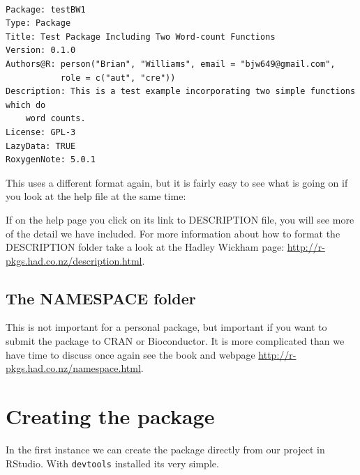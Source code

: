\documentclass[titlepage]{book}\usepackage{knitr}
\begin{document}
\begin{lstlisting}

Package: testBW1
Type: Package
Title: Test Package Including Two Word-count Functions
Version: 0.1.0
Authors@R: person("Brian", "Williams", email = "bjw649@gmail.com",
           role = c("aut", "cre"))
Description: This is a test example incorporating two simple functions which do
    word counts.
License: GPL-3
LazyData: TRUE
RoxygenNote: 5.0.1

\end{lstlisting}

This uses a different format again, but it is fairly easy to see what is going on if you look at the help file at the same time:

\begin{knitrout}
\color{fgcolor}\begin{kframe}
\begin{alltt}
\hlstd{(}\hlstd{=}\hlstd{)}
\end{alltt}
\end{kframe}
\end{knitrout}
If on the help page you click on its link to DESCRIPTION file, you will see more of the detail we have included.  For more information about how to format the DESCRIPTION folder take a look at the Hadley Wickham page: \href{http://r-pkgs.had.co.nz/description.html}{http://r-pkgs.had.co.nz/description.html}.


\subsection{The NAMESPACE folder}
This is not important for a personal package, but important if you want to submit the package to CRAN or Bioconductor.  It is more complicated than we have time to discuss once again see the book \cite{Wickham2015b} and webpage \href{http://r-pkgs.had.co.nz/namespace.html}{http://r-pkgs.had.co.nz/namespace.html}.

\section{Creating the package}
In the first instance we can create the package directly from our project in RStudio.  With \texttt{devtools} installed its very simple.
\end{document}
